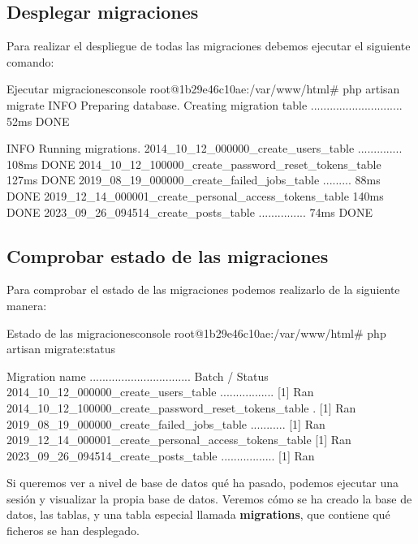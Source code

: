 \subsection{Desplegar migraciones}
Para realizar el despliegue de todas las migraciones debemos ejecutar el siguiente comando:

\begin{mycode}{Ejecutar migraciones}{console}{}
root@1b29e46c10ae:/var/www/html# php artisan migrate
   INFO  Preparing database.
Creating migration table ............................. 52ms DONE

   INFO  Running migrations.
2014_10_12_000000_create_users_table ..............   108ms DONE
2014_10_12_100000_create_password_reset_tokens_table  127ms DONE
2019_08_19_000000_create_failed_jobs_table .........   88ms DONE
2019_12_14_000001_create_personal_access_tokens_table 140ms DONE
2023_09_26_094514_create_posts_table ...............   74ms DONE
\end{mycode}

\subsection{Comprobar estado de las migraciones}

Para comprobar el estado de las migraciones podemos realizarlo de la siguiente manera:
\begin{mycode}{Estado de las migraciones}{console}{}
root@1b29e46c10ae:/var/www/html# php artisan migrate:status

Migration name ................................ Batch / Status
2014_10_12_000000_create_users_table ................. [1] Ran
2014_10_12_100000_create_password_reset_tokens_table . [1] Ran
2019_08_19_000000_create_failed_jobs_table ........... [1] Ran
2019_12_14_000001_create_personal_access_tokens_table  [1] Ran
2023_09_26_094514_create_posts_table ................. [1] Ran
\end{mycode}


Si queremos ver a nivel de base de datos qué ha pasado, podemos ejecutar una sesión y visualizar la propia base de datos. Veremos cómo se ha creado la base de datos, las tablas, y una tabla especial llamada \textbf{migrations}, que contiene qué ficheros se han desplegado.

